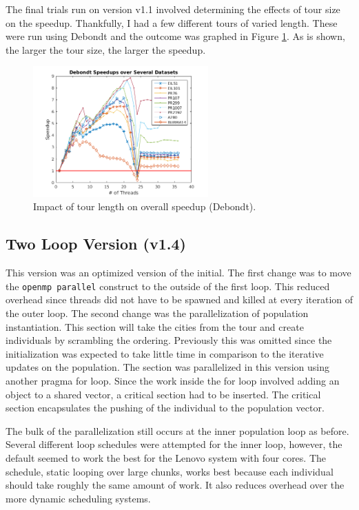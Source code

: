 \documentclass[10pt,letterpaper]{article}
\begin{document}
The final trials run on version v1.1 involved determining the effects of tour size on the speedup. Thankfully, I had a few different tours of varied length. These were run using Debondt and the outcome was graphed in Figure \ref{fig:tours}. As is shown, the larger the tour size, the larger the speedup. 

\begin{figure}
\centering
\includegraphics[width=0.6\textwidth]{../img/dataset_speedups.png} 
\caption{Impact of tour length on overall speedup (Debondt).}
\label{fig:tours}
\end{figure}


\subsection{Two Loop Version (v1.4)} 
This version was an optimized version of the initial. The first change was to move the \texttt{openmp parallel} construct to the outside of the first loop. This reduced overhead since threads did not have to be spawned and killed at every iteration of the outer loop. The second change was the parallelization of population instantiation. This section will take the cities from the tour and create individuals by scrambling the ordering. Previously this was omitted since the initialization was expected to take little time in comparison to the iterative updates on the population. The section was parallelized in this version using another pragma for loop. Since the work inside the for loop involved adding an object to a shared vector, a critical section had to be inserted. The critical section encapsulates the pushing of the individual to the population vector. 

The bulk of the parallelization still occurs at the inner population loop as before. Several different loop schedules were attempted for the inner loop, however, the default seemed to work the best for the Lenovo system with four cores. The schedule, static looping over large chunks, works best because each individual should take roughly the same amount of work. It also reduces overhead over the more dynamic scheduling systems.
\end{document}
